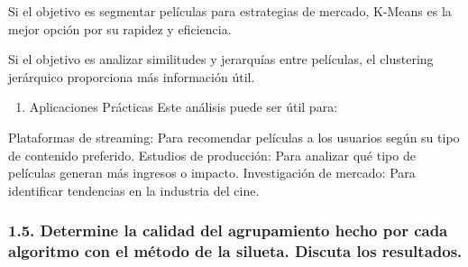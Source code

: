 \documentclass[
]{article}
\providecommand{\tightlist}{%
  \setlength{\itemsep}{0pt}\setlength{\parskip}{0pt}}
\begin{document}
Si el objetivo es segmentar películas para estrategias de mercado,
K-Means es la mejor opción por su rapidez y eficiencia.

Si el objetivo es analizar similitudes y jerarquías entre películas, el
clustering jerárquico proporciona más información útil.

\begin{enumerate}
\def\labelenumi{\arabic{enumi}.}
\setcounter{enumi}{3}
\tightlist
\item
  Aplicaciones Prácticas Este análisis puede ser útil para:
\end{enumerate}

Plataformas de streaming: Para recomendar películas a los usuarios según
su tipo de contenido preferido. Estudios de producción: Para analizar
qué tipo de películas generan más ingresos o impacto. Investigación de
mercado: Para identificar tendencias en la industria del cine.

\subsubsection{1.5. Determine la calidad del agrupamiento hecho por cada
algoritmo con el método de la silueta. Discuta los
resultados.}\label{determine-la-calidad-del-agrupamiento-hecho-por-cada-algoritmo-con-el-muxe9todo-de-la-silueta.-discuta-los-resultados.}
\end{document}
